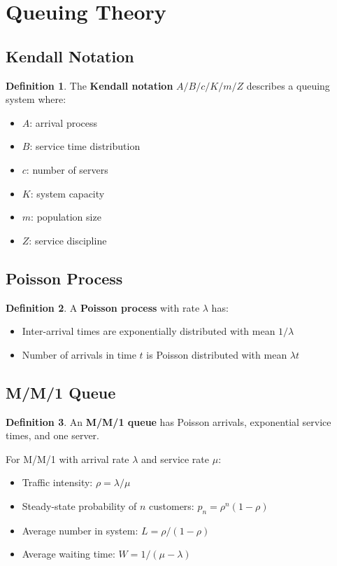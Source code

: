 \documentclass[11pt]{article}
\theoremstyle{definition}
\newtheorem{definition}{Definition}[section]
\begin{document}
\section{Queuing Theory}

\subsection{Kendall Notation}
\begin{definition}
The \textbf{Kendall notation} $A/B/c/K/m/Z$ describes a queuing system where:
\begin{itemize}
    \item $A$: arrival process
    \item $B$: service time distribution
    \item $c$: number of servers
    \item $K$: system capacity
    \item $m$: population size
    \item $Z$: service discipline
\end{itemize}
\end{definition}

\subsection{Poisson Process}
\begin{definition}
A \textbf{Poisson process} with rate $\lambda$ has:
\begin{itemize}
    \item Inter-arrival times are exponentially distributed with mean $1/\lambda$
    \item Number of arrivals in time $t$ is Poisson distributed with mean $\lambda t$
\end{itemize}
\end{definition}

\subsection{M/M/1 Queue}
\begin{definition}
An \textbf{M/M/1 queue} has Poisson arrivals, exponential service times, and one server.
\end{definition}

For M/M/1 with arrival rate $\lambda$ and service rate $\mu$:
\begin{itemize}
    \item Traffic intensity: $\rho = \lambda/\mu$
    \item Steady-state probability of $n$ customers: $p_n = \rho^n(1-\rho)$
    \item Average number in system: $L = \rho/(1-\rho)$
    \item Average waiting time: $W = 1/(\mu-\lambda)$
\end{itemize}
\end{document}
